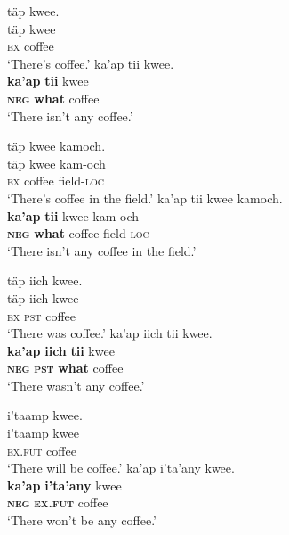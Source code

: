 \documentclass[output=paper,colorlinks,citecolor=brown,draft]{langscibook}
\begin{document}
 
\ea\label{ex:mix:55}
    \ea\label{ex:mix:55a}
        \glll täp kwee.\\ 
              täp kwee\\
              \textsc{ex} coffee \\
        \glt ‘There’s coffee.’    
    \ex\label{ex:mix:55b}
        \glll  ka’ap tii kwee.\\
             \textbf{ka’ap} \textbf{tii} kwee\\
             \textbf{\textsc{neg} } \textbf{what} coffee\\
        \glt ‘There isn’t any coffee.’
    \z
\z 
 
\ea\label{ex:mix:56}
    \ea\label{ex:mix:56a}
        \glll täp kwee kamoch. \\ 
              täp kwee kam-och\\
              \textsc{ex} coffee field-\textsc{loc}\\
        \glt ‘There’s coffee in the field.’    
    \ex\label{ex:mix:56b}
        \glll ka’ap tii kwee kamoch.\\
             \textbf{ka’ap} \textbf{tii} kwee kam-och\\
             \textbf{\textsc{neg}} \textbf{what} coffee field-\textsc{loc}\\
        \glt ‘There isn’t any coffee in the field.’
    \z
\z 
 
\ea\label{ex:mix:57}
    \ea\label{ex:mix:57a}
        \glll täp iich kwee.\\ 
              täp iich kwee\\
              \textsc{ex} \textsc{pst} coffee\\
        \glt ‘There was coffee.’    
    \ex\label{ex:mix:57b}
        \glll ka’ap iich tii kwee. \\
             \textbf{ka’ap} \textbf{iich} \textbf{tii} kwee\\
             \textbf{\textsc{neg}} \textsc{\textbf{pst}} \textbf{what} coffee\\
        \glt ‘There wasn’t any coffee.’
    \z
\z 
 
\ea\label{ex:mix:58}
    \ea\label{ex:mix:58a}
        \glll i'taamp kwee.\\ 
              i'taamp kwee\\
              \textsc{ex.fut} coffee\\
        \glt ‘There will be coffee.’    
    \ex\label{ex:mix:58b}
        \glll ka’ap i'ta’any kwee.\\
             \textbf{ka’ap} \textbf{i'ta’any} kwee\\
            \textbf{\textsc{neg}} \textsc{\textbf{ex.fut}} coffee \\
        \glt ‘There won’t be any coffee.’
    \z
\z 
 
\end{document}
